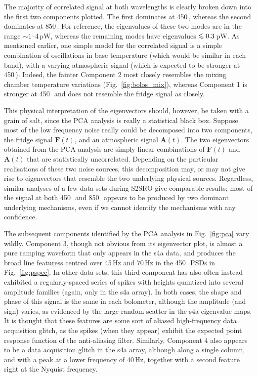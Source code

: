 \documentclass[useAMS,usenatbib,nofootinbib]{mn2e}
\def\lsim{\mathrel{\lower2.5pt\vbox{\lineskip=0pt\baselineskip=0pt
          \hbox{$<$}\hbox{$\sim$}}}}
\begin{document}
The majority of correlated signal at both wavelengths is clearly
broken down into the first two components plotted. The first dominates
at 450\,\micron, whereas the second dominates at 850\,\micron. For
reference, the eigenvalues of these two modes are in the range
$\sim1$--4\,pW, whereas the remaining modes have eigenvalues
$\lsim0.3$\,pW. As mentioned earlier, one simple model for the
correlated signal is a simple combination of oscillations in base
temperature (which would be similar in each band), with a varying
atmospheric signal (which is expected to be stronger at
450\,\micron). Indeed, the fainter Component 2 most closely resembles
the mixing chamber temperature variations (Fig.~\ref{fig:bolos_mix}),
whereas Component 1 is stronger at 450\,\micron\ and does not resemble
the fridge signal as closely.

This physical interpretation of the eigenvectors should, however, be
taken with a grain of salt, since the PCA analysis is really a
statistical black box. Suppose most of the low frequency noise really
could be decomposed into two components, the fridge signal
$\mathbf{F}(t)$, and an atmospheric signal $\mathbf{A}(t)$. The two
eigenvectors obtained from the PCA analysis are simply linear
combinations of $\mathbf{F}(t)$ and $\mathbf{A}(t)$ that are
statistically uncorrelated. Depending on the particular realisations
of these two noise sources, this decomposition may, or may not give
rise to eigenvectors that resemble the two underlying physical
sources. Regardless, similar analyses of a few data sets during S2SRO
give comparable results; most of the signal at both 450\,\micron\ and
850\,\micron\ appears to be produced by two dominant underlying
mechanisms, even if we cannot identify the mechanisms with any
confidence.

The subsequent components identified by the PCA analysis in
Fig.~\ref{fig:pca} vary wildly. Component 3, though not obvious from
its eigenvector plot, is almost a pure ramping waveform that only
appears in the s4a data, and produces the broad line featuress centred
over 45\,Hz and 70\,Hz in the 450\,\micron\ PSDs in
Fig.~\ref{fig:pspec}. In other data sets, this third component has
also often instead exhibited a regularly-spaced series of spikes with
heights quantized into several amplitude families (again, only in the
s4a array). In both cases, the shape and phase of this signal is the
same in each bolometer, although the amplitude (and sign) varies, as
evidenced by the large random scatter in the s4a eigenvalue maps. It
is thought that these features are some sort of aliased high-frequency
data acquisition glitch, as the spikes (when they appear) exhibit the
expected point response function of the anti-aliasing
filter. Similarly, Component 4 also appears to be a data acquisition
glitch in the s4a array, although along a single column, and with a
peak at a lower frequency of 40\,Hz, together with a second feature
right at the Nyquist frequency.
\end{document}
